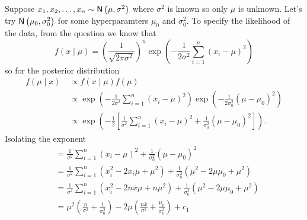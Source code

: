 \begin{exam} \label{exam: bay_norm}
    Suppose $x_1 , x_2 , \ldots , x_n \sim {\sf N} \left( \mu , \sigma^2 \right)$ where $\sigma^2$ is known so only $\mu$ is unknown. Let's try ${\sf N} \left( \mu_0 , \sigma_0^2 \right)$ for some hyperparamters $\mu_0$ and $\sigma_0^2$. To specify the likelihood of the data, from the question we know that
    \[
        f (x \mid \mu ) = \left( \frac{1}{\sqrt{2 \pi \sigma^2}} \right)^n \exp \left( - \frac{1}{2\sigma^2} \sum_{i=1}^{n} \left( x_i - \mu \right)^2 \right)
    \]
    so for the posterior distribution
    \begin{align*}
        f (\mu \mid x) \
         & \propto f(x \mid \mu ) f(\mu)                                                                                                                                              \\
         & \propto \exp \left( - \frac{1}{2\sigma^2} \sum_{i=1}^{n} \left( x_i - \mu \right)^2 \right) \exp \left( - \frac{1}{2\sigma_0^2} \left( \mu - \mu_0 \right)^2 \right)       \\
         & \propto \exp \left( - \frac{1}{2} \left[ \frac{1}{\sigma^2} \sum_{i=1}^{n} \left( x_i - \mu \right)^2 + \frac{1}{\sigma_0^2} \left( \mu - \mu_0 \right)^2 \right] \right).
    \end{align*}
    Isolating the exponent
    \begin{align*}
         & = \frac{1}{\sigma^2} \sum_{i=1}^{n} \left( x_i - \mu \right)^2 + \frac{1}{\sigma_0^2} \left( \mu - \mu_0 \right)^2                                                                                                                  \\
         & = \frac{1}{\sigma^2} \sum_{i=1}^{n} \left( x_i^2 - 2 x_i \mu + \mu^2 \right) + \frac{1}{\sigma_0^2} \left( \mu^2 - 2 \mu \mu_0 + \mu^2 \right)                                                                                      \\
         & = \frac{1}{\sigma^2} \sum_{i=1}^{n} \left( x_i^2 - 2 n \bar{x} \mu + n \mu^2 \right) + \frac{1}{\sigma_0^2} \left( \mu^2 - 2 \mu \mu_0 + \mu^2 \right)                                                                              \\
         & = \mu^2 \left( \frac{n}{\sigma^2} + \frac{1}{\sigma_0^2} \right) - 2 \mu \left( \frac{n \bar{x}}{\sigma^2} + \frac{\mu_0}{\sigma_0^2} \right) + c_1                                                                                 \\

\end{align*}
\end{exam}
